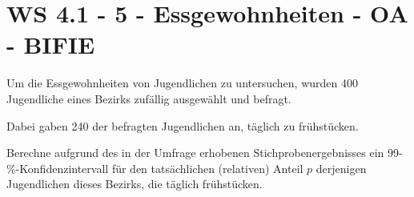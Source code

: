 \section{WS 4.1 - 5 - Essgewohnheiten - OA - BIFIE}

\begin{beispiel}[WS 4.1]{1} %
				Um die Essgewohnheiten von Jugendlichen zu untersuchen, wurden 400 Jugendliche eines Bezirks zufällig ausgewählt und befragt.

Dabei gaben 240 der befragten Jugendlichen an, täglich zu frühstücken.

Berechne aufgrund des in der Umfrage erhobenen Stichprobenergebnisses ein 99-\%-Konfidenzintervall für den tatsächlichen (relativen) Anteil $p$ derjenigen Jugendlichen dieses Bezirks, die täglich frühstücken.\\

\end{beispiel}	